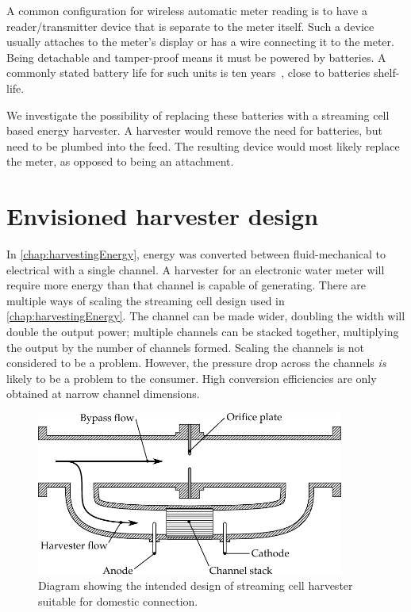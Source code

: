   A common configuration for wireless automatic meter reading is to have a reader/transmitter device that is separate to the meter itself.
  Such a device usually attaches to the meter's display or has a wire connecting it to the meter.
  Being detachable and tamper-proof means it must be powered by batteries.
  A commonly stated battery life for such units is ten years~\cite{BMeters2014}, close to batteries shelf-life.

  We investigate the possibility of replacing these batteries with a streaming cell based energy harvester.
  A harvester would remove the need for batteries, but need to be plumbed into the feed.
  The resulting device would most likely replace the meter, as opposed to being an attachment. 

  \section{Envisioned harvester design}

    In \cref{chap:harvestingEnergy}, energy was converted between fluid-mechanical to electrical with a single channel.
    A harvester for an electronic water meter will require more energy than that channel is capable of generating.
    There are multiple ways of scaling the streaming cell design used in \cref{chap:harvestingEnergy}.
    The channel can be made wider, doubling the width will double the output power;
    multiple channels can be stacked together, multiplying the output by the number of channels formed.
    Scaling the channels is not considered to be a problem.
    However, the pressure drop across the channels \emph{is} likely to be a problem to the consumer.
    High conversion efficiencies are only obtained at narrow channel dimensions.

    \begin{figure}
      \centering
      \includegraphics[width=0.9\textwidth]{content/pt1/02-WirelessWaterMeter/graphics/harvester}
      \caption{\label{fig:Diagram_harvester}Diagram showing the intended design of streaming cell harvester suitable for domestic connection.}
    \end{figure}

